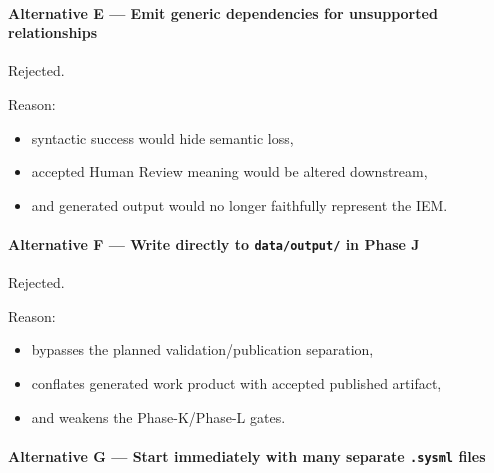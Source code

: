 \hypertarget{alternative-e--emit-generic-dependencies-for-unsupported-relationships}{%
\paragraph{Alternative E --- Emit generic dependencies for unsupported relationships}\label{alternative-e--emit-generic-dependencies-for-unsupported-relationships}}

Rejected.

Reason:

\begin{itemize}
\tightlist
\item
  syntactic success would hide semantic loss,
\item
  accepted Human Review meaning would be altered downstream,
\item
  and generated output would no longer faithfully represent the IEM.
\end{itemize}

\hypertarget{alternative-f--write-directly-to-dataoutput-in-phase-j}{%
\paragraph{\texorpdfstring{Alternative F --- Write directly to \texttt{data/output/} in Phase J}{Alternative F --- Write directly to data/output/ in Phase J}}\label{alternative-f--write-directly-to-dataoutput-in-phase-j}}

Rejected.

Reason:

\begin{itemize}
\tightlist
\item
  bypasses the planned validation/publication separation,
\item
  conflates generated work product with accepted published artifact,
\item
  and weakens the Phase-K/Phase-L gates.
\end{itemize}

\hypertarget{alternative-g--start-immediately-with-many-separate-sysml-files}{%
\paragraph{\texorpdfstring{Alternative G --- Start immediately with many separate \texttt{.sysml} files}{Alternative G --- Start immediately with many separate .sysml files}}\label{alternative-g--start-immediately-with-many-separate-sysml-files}}

